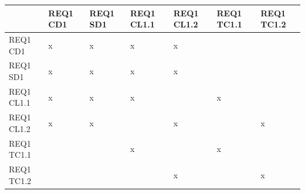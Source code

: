 \documentclass{article}
\begin{document}
\begin{center}
    \begin{longtable}{|p{0.4in}|p{0.4in}|p{0.4in}|p{0.4in}|p{0.4in}|p{0.4in}|p{0.4in}|}
    \hline
             & REQ1 CD1 & REQ1 SD1 & REQ1 CL1.1 & REQ1 CL1.2 & REQ1 TC1.1 & REQ1 TC1.2 \\ \hline
    REQ1 CD1 &    x    &    x     &     x      &     x      &            &            \\ \hline
    REQ1 SD1 &    x    &    x     &     x      &     x      &            &            \\ \hline
    REQ1 CL1.1 &   x     &   x      &    x       &            &      x      &            \\ \hline
    REQ1 CL1.2 &   x     &   x      &            &     x      &            &     x     \\ \hline
    REQ1 TC1.1 &         &          &    x       &            &      x     &            \\ \hline
    REQ1 TC1.2 &         &          &            &     x      &            &     x      \\ \hline
	
	\end{longtable}	
\end{center}
\end{document}
